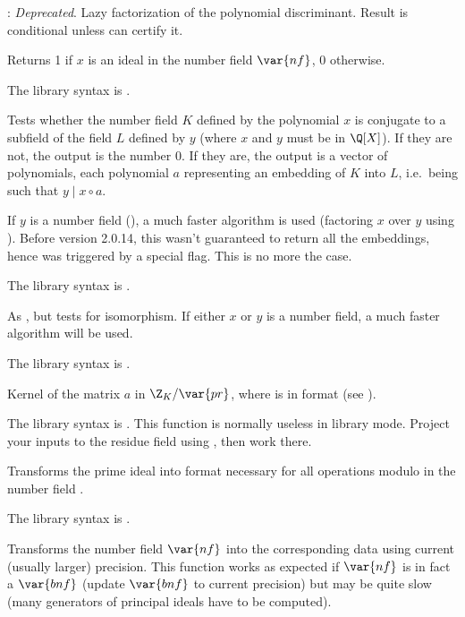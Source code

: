 \item {}: \emph{Deprecated}. Lazy factorization of the
polynomial discriminant. Result is conditional unless 
can certify it.

\label{se:nfisideal}
Returns 1 if $x$ is an ideal in the number field $\var{nf}$, 0 otherwise.

The library syntax is .

\label{se:nfisincl}
Tests whether the number field $K$ defined
by the polynomial $x$ is conjugate to a subfield of the field $L$ defined
by $y$ (where $x$ and $y$ must be in $\Q[X]$). If they are not, the output
is the number 0. If they are, the output is a vector of polynomials, each
polynomial $a$ representing an embedding of $K$ into $L$, i.e.~being such
that $y\mid x\circ a$.

If $y$ is a number field (), a much faster algorithm is used
(factoring $x$ over $y$ using ). Before version 2.0.14, this
wasn't guaranteed to return all the embeddings, hence was triggered by a
special flag. This is no more the case.

The library syntax is .

\label{se:nfisisom}
As , but tests for isomorphism. If either $x$ or $y$ is a
number field, a much faster algorithm will be used.

The library syntax is .

\label{se:nfkermodpr}
Kernel of the matrix $a$ in $\Z_K/\var{pr}$, where  is in
 format (see ).

The library syntax is .
This function is normally useless in library mode. Project your
inputs to the residue field using , then work there.

\label{se:nfmodprinit}
Transforms the prime ideal  into  format necessary
for all operations modulo  in the number field .

The library syntax is .

\label{se:nfnewprec}
Transforms the number field $\var{nf}$
into the corresponding data using current (usually larger) precision. This
function works as expected if $\var{nf}$ is in fact a $\var{bnf}$ (update
$\var{bnf}$ to current precision) but may be quite slow (many generators of
principal ideals have to be computed).

